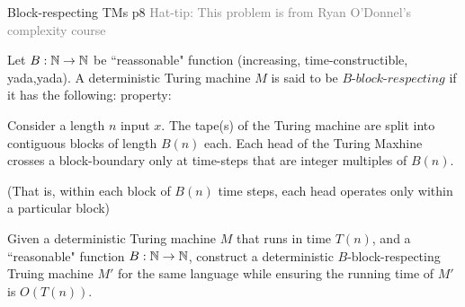 \documentclass[a4paper, 11pt]{article}
\begin{document}
\newpage

\begin{problem}{%
		Block-respecting TMs
	}{p8%
}
\textcolor{gray}{Hat-tip: This problem is from Ryan O'Donnel's complexity course}

Let $B:\mathbb{N}\to\mathbb{N}$ be ``reassonable" function (increasing, time-constructible, yada,yada). A deterministic Turing machine $M$ is said to be $B\textit{-block-respecting}$ if it has the following: property:
\begin{center}
	\begin{minipage}{0.9\textwidth}
		Consider a length $n$ input $x$. The tape(s) of the Turing machine are split into contiguous blocks of length $B(n)$ each. Each head of the Turing Maxhine crosses a block-boundary only at time-steps that are integer multiples of $B(n)$.
		
		(That is, within each block of $B(n)$ time steps, each head operates only within a particular block)
	\end{minipage}
\end{center}

Given a deterministic Turing machine $M$ that runs in time $T(n)$, and a ``reasonable" function $B:\mathbb{N}\to\mathbb{N}$, construct a deterministic $B$-block-respecting Truing machine $M'$ for the same language while ensuring the running time of $M'$ is $O(T(n))$.

\noindent{}
	\end{problem}
\end{document}
